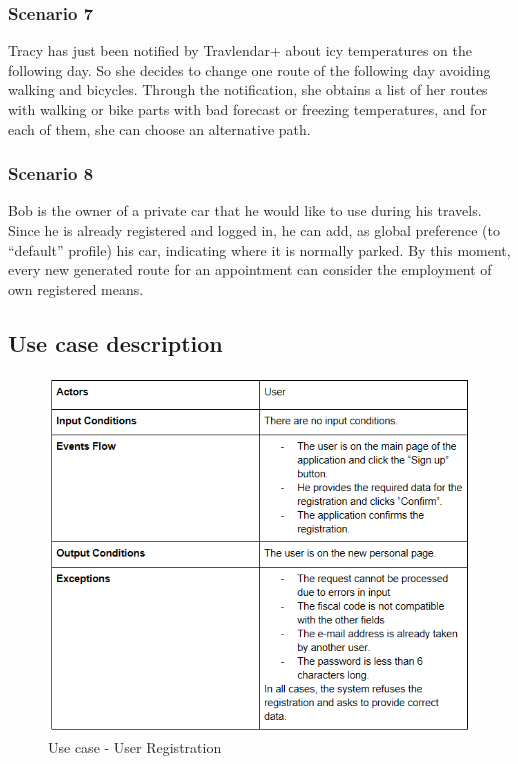 	\subsubsection{Scenario 7}
	Tracy has just been notified by Travlendar+ about icy temperatures on the following day. So she decides to change one route of the following day avoiding walking and bicycles. Through the notification, she obtains a list of her routes with walking or bike parts with bad forecast or freezing temperatures, and for each of them, she can choose an alternative path.
	\subsubsection{Scenario 8}
	Bob is the owner of a private car that he would like to use during his travels. Since he is already registered and logged in, he can add, as global preference (to “default” profile) his car, indicating where it is normally parked. By this moment, every new generated route for an appointment can consider the employment of own registered means.
	
	
\subsection{Use case description}
\begin{figure} [H]
	\centering
	\includegraphics{Images/UseCaseTables/1_user_reg.PNG}
	\caption{\label{fig:useCase1}Use case - User Registration }
\end{figure}

